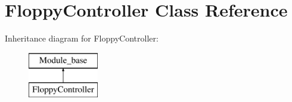 \hypertarget{classFloppyController}{\section{Floppy\-Controller Class Reference}
\label{classFloppyController}
}
Inheritance diagram for Floppy\-Controller\-:\begin{figure}[H]
\begin{center}
\leavevmode
\includegraphics[height=2.000000cm]{classFloppyController}
\end{center}
\end{figure}
